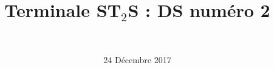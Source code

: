 \documentclass[a4paper,11pt]{exam}
\author{\ }
\date{24 Décembre 2017}
\title{Terminale ST$_2$S : DS num\'ero 2}
\begin{document}
%	

	
	

\ 
\ 
\\

\newpage






\newpage


%
\newpage
%	

%


	\label{LastPage}

%
%


	
\end{document}
